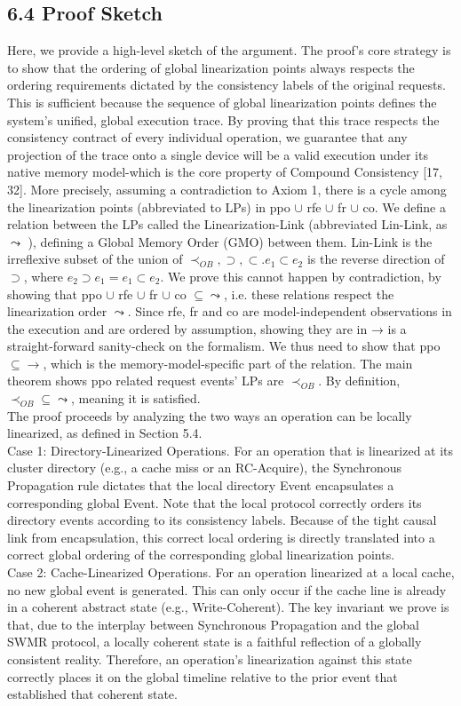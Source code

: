 \documentclass[10pt]{article}
\begin{document}
\subsection*{6.4 Proof Sketch}
Here, we provide a high-level sketch of the argument. The proof's core strategy is to show that the ordering of global linearization points always respects the ordering requirements dictated by the consistency labels of the original requests. This is sufficient because the sequence of global linearization points defines the system's unified, global execution trace. By proving that this trace respects the consistency contract of every individual operation, we guarantee that any projection of the trace onto a single device will be a valid execution under its native memory model-which is the core property of Compound Consistency [17, 32]. More precisely, assuming a contradiction to Axiom 1, there is a cycle among the linearization points (abbreviated to LPs) in ppo $\cup$ rfe $\cup$ fr $\cup$ co. We define a relation between the LPs called the Linearization-Link (abbreviated Lin-Link, as $\leadsto$ ), defining a Global Memory Order (GMO) between them. Lin-Link is the irreflexive subset of the union of $\prec_{O B}, \supset, \subset . e_{1} \subset e_{2}$ is the reverse direction of $\supset$, where $e_{2} \supset e_{1}=e_{1} \subset e_{2}$. We prove this cannot happen by contradiction, by showing that ppo $\cup$ rfe $\cup$ fr $\cup$ co $\subseteq \leadsto$, i.e. these relations respect the linearization order $\leadsto$. Since rfe, fr and co are model-independent observations in the execution and are ordered by assumption, showing they are in → is a straight-forward sanity-check on the formalism. We thus need to show that ppo $\subseteq \rightarrow$, which is the memory-model-specific part of the relation. The main theorem shows ppo related request events' LPs are $\prec_{O B}$. By definition, $\prec_{O B} \subseteq \leadsto$, meaning it is satisfied.\\
The proof proceeds by analyzing the two ways an operation can be locally linearized, as defined in Section 5.4.\\
Case 1: Directory-Linearized Operations. For an operation that is linearized at its cluster directory (e.g., a cache miss or an RC-Acquire), the Synchronous Propagation rule dictates that the local directory Event encapsulates a corresponding global Event. Note that the local protocol correctly orders its directory events according to its consistency labels. Because of the tight causal link from encapsulation, this correct local ordering is directly translated into a correct global ordering of the corresponding global linearization points.\\
Case 2: Cache-Linearized Operations. For an operation linearized at a local cache, no new global event is generated. This can only occur if the cache line is already in a coherent abstract state (e.g., Write-Coherent). The key invariant we prove is that, due to the interplay between Synchronous Propagation and the global SWMR protocol, a locally coherent state is a faithful reflection of a globally consistent reality. Therefore, an operation's linearization against this state correctly places it on the global timeline relative to the prior event that established that coherent state.
\end{document}
